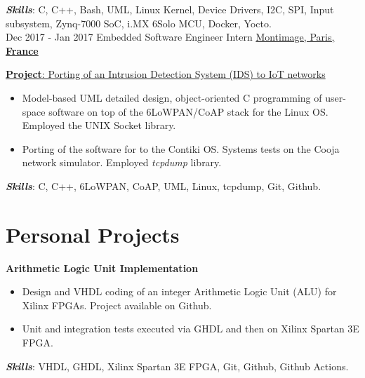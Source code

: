 \documentclass[letterpaper]{twentysecondcv} %
\begin{document}
\begin{twenty}
{            \vspace{2 mm}
            \textbf{\textit{Skills}}: C, C++, Bash, UML, Linux Kernel, Device Drivers, I2C, SPI, Input subsystem, Zynq-7000 SoC, i.MX 6Solo MCU, Docker, Yocto.
    }\\
    \twentyitem
        {Dec 2017 -}
        {Jan 2017}
        {Embedded Software Engineer Intern}
        {\href{https://www.montimage.com/}{Montimage, Paris, \textbf{France}}}
        {}
        {
            \vspace{2 mm}
            \underline{\textbf{Project}: Porting of an Intrusion Detection System (IDS) to IoT networks}

            \vspace{2 mm}
            \begin{itemize}
                \item Model-based UML detailed design, object-oriented C programming of user-space software on top of the 6LoWPAN/CoAP stack for the Linux OS. Employed the UNIX Socket library.
                \item Porting of the software for to the Contiki OS. Systems tests on the Cooja network simulator. Employed \textit{tcpdump} library.
            \end{itemize}

            \vspace{2 mm}
            \textbf{\textit{Skills}}: C, C++, 6LoWPAN, CoAP, UML, Linux, tcpdump, Git, Github.
        }
\end{twenty}

\section{Personal Projects}

\textbf{Arithmetic Logic Unit Implementation}

\begin{itemize}
    \item Design and VHDL coding of an integer Arithmetic Logic Unit (ALU) for Xilinx FPGAs. Project available on Github.
    \item Unit and integration tests executed via GHDL and then on Xilinx Spartan 3E FPGA.
\end{itemize}

\textbf{\textit{Skills}}: VHDL, GHDL, Xilinx Spartan 3E FPGA, Git, Github, Github Actions.
\end{document}
